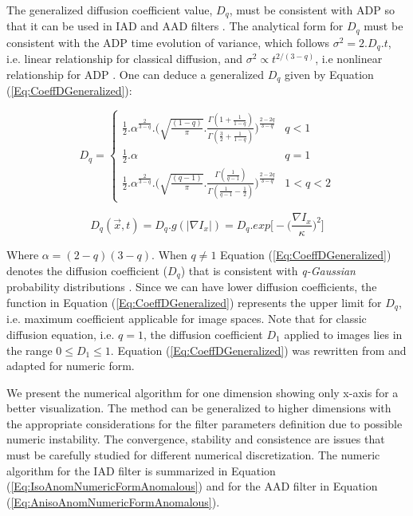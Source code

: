 \documentclass{InsightArticle}
\begin{document}
The generalized diffusion coefficient value, $D_q$, must be consistent with ADP so that it can be used in IAD and AAD filters \cite{Schwammle2008}. The analytical form for $D_q$ must be consistent with the ADP time evolution of variance, which follows $\sigma^{2} = 2.D_q.t$, i.e. linear relationship for classical diffusion, and $\sigma^2 \propto t^{2/(3 - q)}$, i.e nonlinear relationship for ADP \cite{Tsallis2009Livro}. One can deduce a generalized $D_q$ given by Equation (\ref{Eq:CoeffDGeneralized}):

\begin{equation}\label{Eq:CoeffDGeneralized}
D_q = 
\begin{cases}
  \frac{1}{2}.\alpha^{\frac{2}{3-q}}.\Big(\sqrt{\frac{(1-q)}{\pi}}.\frac{\Gamma (1 + \frac{1}{1 - q})}{\Gamma (\frac{3}{2} + \frac{1}{1-q})}\Big)^{\frac{2-2q}{3-q}}  & q < 1 \\
	  \frac{1}{2}.\alpha & q = 1 \\
	  \frac{1}{2}.\alpha^{\frac{2}{3-q}}.\Big(\sqrt{\frac{(q-1)}{\pi}}.\frac{\Gamma (\frac{1}{q-1})}{\Gamma (\frac{1}{q-1} - \frac{1}{2})}\Big)^{\frac{2-2q}{3-q}}  & 1 < q < 2
	  
\end{cases}
\end{equation}

\begin{equation}\label{Eq:gFunction}
  D_q(\overrightarrow{x},t)=D_q.g(|\nabla I_{x}|)=D_q. exp\Big[ -\Big( \frac{\nabla I_{x}}{\kappa}\Big)^{2} \Big]
\end{equation}

Where $\alpha = (2 - q)(3 - q)$. When $q \neq 1$ Equation (\ref{Eq:CoeffDGeneralized}) denotes the diffusion coefficient ($D_q$) that is consistent with \textit{q-Gaussian} probability distributions \cite{Tsallis2009Livro}. Since we can have lower diffusion coefficients, the function in Equation (\ref{Eq:CoeffDGeneralized}) represents the upper limit for $D_q$, i.e. maximum coefficient applicable for image spaces. Note that for classic diffusion equation, i.e. $q = 1$, the diffusion coefficient $D_1$ applied to images lies in the range $0 \leq D_1 \leq 1$. Equation (\ref{Eq:CoeffDGeneralized}) was rewritten from \cite{Schwammle2008} and adapted for numeric form.

We present the numerical algorithm for one dimension showing only x-axis for a better visualization. The method can be generalized to higher dimensions with the appropriate considerations for the filter parameters definition due to possible numeric instability. The convergence, stability and consistence are issues that must be carefully studied for different numerical discretization. The numeric algorithm for the IAD filter is summarized in Equation (\ref{Eq:IsoAnomNumericFormAnomalous}) and for the AAD filter in Equation (\ref{Eq:AnisoAnomNumericFormAnomalous}).
\end{document}
